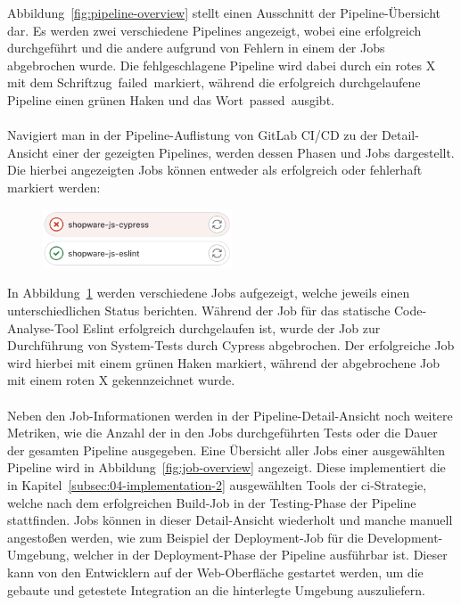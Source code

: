 Abbildung\ \ref{fig:pipeline-overview} stellt einen Ausschnitt der Pipeline-Übersicht dar.
Es werden zwei verschiedene Pipelines angezeigt, wobei eine erfolgreich durchgeführt und die andere
aufgrund von Fehlern in einem der Jobs abgebrochen wurde.
Die fehlgeschlagene Pipeline wird dabei durch ein rotes X mit dem Schriftzug\ \glqq failed\grqq\ markiert, während die
erfolgreich durchgelaufene Pipeline einen grünen Haken und das Wort\ \glqq passed\grqq\ ausgibt.
\\\\
Navigiert man in der Pipeline-Auflistung von GitLab CI/CD zu der Detail-Ansicht einer der gezeigten Pipelines, werden
dessen Phasen und Jobs dargestellt.
Die hierbei angezeigten Jobs können entweder als erfolgreich oder fehlerhaft markiert werden:

\begin{figure}[H]
    \centering
    \includegraphics[width=0.5\textwidth]{images/content/job-status}
    \label{fig:job-status}
\end{figure}

In Abbildung\ \ref{fig:job-status} werden verschiedene Jobs aufgezeigt, welche jeweils einen unterschiedlichen Status
berichten.
Während der Job für das statische Code-Analyse-Tool Eslint erfolgreich durchgelaufen ist, wurde der Job zur
Durchführung von System-Tests durch Cypress abgebrochen.
Der erfolgreiche Job wird hierbei mit einem grünen Haken markiert, während der abgebrochene Job mit einem roten X
gekennzeichnet wurde.
\\\\
Neben den Job-Informationen werden in der Pipeline-Detail-Ansicht noch weitere Metriken, wie die Anzahl der in den Jobs
durchgeführten Tests oder die Dauer der gesamten Pipeline ausgegeben.
Eine Übersicht aller Jobs einer ausgewählten Pipeline wird in Abbildung\ \ref{fig:job-overview} angezeigt.
Diese implementiert die in Kapitel\ \ref{subsec:04-implementation-2} ausgewählten Tools der \acrshort{ci}-Strategie,
welche nach dem erfolgreichen Build-Job in der Testing-Phase der Pipeline stattfinden.
Jobs können in dieser Detail-Ansicht wiederholt und manche manuell angestoßen werden, wie zum Beispiel der
Deployment-Job für die Development-Umgebung, welcher in der Deployment-Phase der Pipeline ausführbar ist.
Dieser kann von den Entwicklern auf der Web-Oberfläche gestartet werden, um die gebaute und getestete Integration an die
hinterlegte Umgebung auszuliefern.

